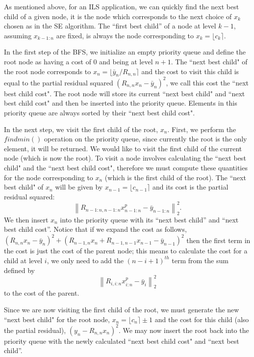 \documentclass[12pt,Bold,letterpaper]{mcgilletdclass}
\begin{document}
As mentioned above, for an ILS application, we can quickly find the next best child of a given node, it is the node which corresponds to the next choice of $x_k$ chosen as in the SE algorithm. The ``first best child'' of a node at level $k-1$, assuming $x_{k-1:n}$ are fixed, is always the node corresponding to $x_k = \lfloor c_k \rceil$.

In the first step of the BFS, we initialize an empty priority queue and define the root node as having a cost of $0$ and being at level $n+1$. The ``next best child" of the root node corresponds to $x_n = \lfloor \bar{y}_n/R_{n,n} \rceil$ and the cost to visit this child is equal to the partial residual squared $(R_{n,n}x_n - \bar{y}_n)^2$, we call this cost the ``next best child cost". The root node will store its current ``next best child" and ``next best child cost" and then be inserted into the priority queue. Elements in this priority queue are always sorted by their ``next best child cost".

In the next step, we visit the first child of the root, $x_{n}$. First, we perform the $findmin()$ operation on the priority queue, since currently the root is the only element, it will be returned. We would like to visit the first child of the current node (which is now the root). To visit a node involves calculating the ``next best child" and the ``next best child cost", therefore we must compute these quantities for the node corresponding to $x_{n}$ (which is the first child of the root). The ``next best child" of $x_n$ will be given by $x_{n-1} = \lfloor c_{n-1} \rceil$ and its cost is the partial residual squared: $$\left \| R_{n-1:n,n-1:n}x_{n-1:n}^p - \bar{y}_{n-1:n}\right \|_2^2.$$ We then insert $x_n$ into the priority queue with its ``next best child'' and ``next best child cost''. Notice that if we expand the cost as follows, $(R_{n,n}x_n - \bar{y}_n)^2 + (R_{n-1,n}x_n + R_{n-1,n-1}x_{n-1} - \bar{y}_{n-1})^2$ then the first term in the cost is just the cost of the parent node; this means to calculate the cost for a child at level $i$, we only need to add the $(n-i+1)^{th}$ term from the sum defined by $$\left \| R_{i,i:n}x_{i:n}^p - \bar{y}_{i}\right \|_2^2$$ to the cost of the parent.

Since we are now visiting the first child of the root, we must generate the new ``next best child" for the root node, $x_n = \lfloor c_n \rceil \pm 1$ and the cost for this child (also the partial residual), $(y_n - R_{n,n}x_n)^2$. We may now insert the root back into the priority queue with the newly calculated ``next best child cost" and ``next best child''.
 
\end{document}
